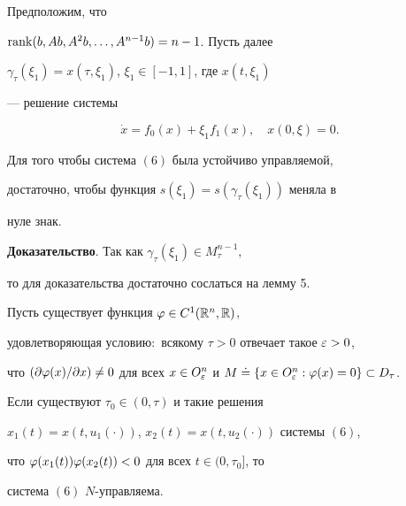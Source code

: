 \begin{thm}


Предположим, что


$\operatorname{rank}(b,Ab,A^2b,\dotsc,A^{n-1}b)=n-1$. Пусть далее


$\gamma_{\tau}(\xi_1)=x(\tau,\xi_1)$, $\xi_1\in[-1,1]$, где $x(t,\xi_1)$


--- решение системы


\begin{equation}


\Dot x=f_0(x)+\xi_1f_1(x),\quad x(0,\xi)=0.


\end{equation}


Для того чтобы система $(6)$ была устойчиво управляемой,


достаточно, чтобы функция $s(\xi_1)=s(\gamma_{\tau}(\xi_1))$ меняла в


нуле знак.


\end{thm}





{\bf Доказательство}. Так как $\gamma_{\tau}(\xi_1)\in M^{n-1}_{\tau}$,


то для доказательства достаточно сослаться на лемму 5.





\begin{thm}


Пусть существует функция $\varphi\in C^1(\Bbb R^n,\Bbb R)$,


удовлетворяющая условию$:$ всякому $\tau>0$ отвечает такое $\varepsilon>0$,


что $(\Pt\vfi(x)/\Pt x)\ne 0$ для всех $x\in


O^n_{\ve}$ и $M\de\{x\in O^n_{\ve}:\vfi(x)=0\}\subset D_{\tau}$.





Если существуют $\tau_0\in(0,\tau)$ и такие решения


$x_1(t)=x(t,u_1(\cdot))$, $x_2(t)=x(t,u_2(\cdot))$ системы $(6)$,


что $\varphi(x_1(t))\varphi(x_2(t))<0$ для всех $t\in(0,\tau_0]$, то


система $(6)$ $N$-управляема.


\end{thm}





